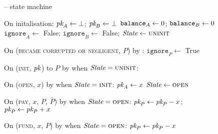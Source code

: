 \begin{figure}[H]
  \begin{systembox}{\fchan{} -- state machine}
    \begin{algorithmic}[1]
      \State On initalisation:
      \Indent
        \State $\textit{pk}_{A} \gets \bot$; $\textit{pk}_{B} \gets \bot$
        \State $\texttt{balance}_{A} \gets 0$; $\texttt{balance}_{B} \gets 0$
        \State $\texttt{ignore}_A \gets$ False;
        $\texttt{ignore}_B \gets$ False;
        \State $\itistate \gets \textsc{uninit}$
      \EndIndent
      \Statex

      \State On (\textsc{became corrupted or negligent}, $P$) by \adversary:
      \Indent
        \State $\texttt{ignore}_P \gets$ True
         
      \EndIndent
      \Statex

      \State On (\textsc{init}, $\textit{pk}_{}$) to $P$ by \environment when $\itistate
      = \textsc{uninit}$:
      \Indent
      \EndIndent
      \Statex

      \State On (\textsc{open}, $x$) by \adversary when $\itistate =
      \textsc{init}$:
      \Indent
        \State $\textit{pk}_{A} \gets x$
        \State $\itistate \gets \textsc{open}$
      \EndIndent
      \Statex

      \State On (\textsc{pay}, $x$, $P$, $\bar{P}$) by \adversary when
      $\itistate = \textsc{open}$: 
      \Indent
        \State $\textit{pk}_{P} \gets \textit{pk}_{P} - x$; $\textit{pk}_{\bar{P}} \gets \textit{pk}_{\bar{P}} + x$
      \EndIndent
      \Statex

      \State On (\textsc{fund}, $x$, $P$) by \adversary when $\itistate =
      \textsc{open}$:
      \Indent
        \State $\textit{pk}_{P} \gets \textit{pk}_{P} - x$
      \EndIndent
      \Statex


\end{algorithmic}
\end{systembox}
\end{figure}
